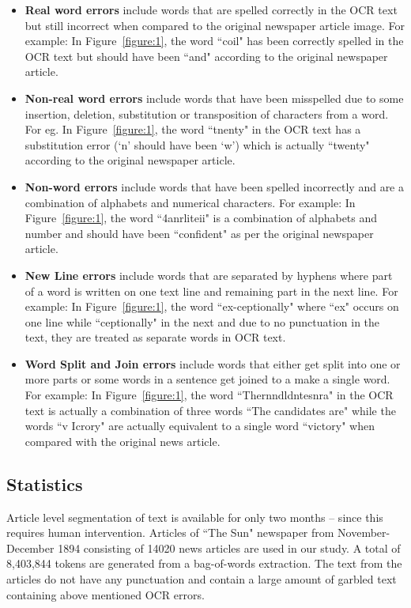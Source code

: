 \begin{itemize}
 \item \textbf{Real word errors}	 include words that are spelled correctly in the OCR text but still incorrect when compared to the original newspaper article image. For example: In Figure~\ref{figure:1}, the word ``coil"  has been correctly spelled in the OCR text  but should have been ``and" according to the original newspaper article. 
 \item \textbf{Non-real word errors} include words that have been misspelled due to some insertion, deletion, substitution or transposition of characters from a word. For eg. In Figure~\ref{figure:1}, the word ``tnenty" in the OCR text has a substitution error (`n' should have been `w') which is actually ``twenty" according to the original newspaper article.
 \item \textbf{Non-word errors} include words that have been spelled incorrectly and are a combination of alphabets and numerical characters. For example: In Figure~\ref{figure:1}, the word ``4anrliteii" is a combination of alphabets and number and should have been ``confident" as per the original newspaper article.
\item \textbf{New Line errors} include words that are separated by hyphens where part of a word is written on one text line and remaining part in the next line. For example: In Figure~\ref{figure:1}, the word ``ex-ceptionally" where ``ex" occurs on one line while ``ceptionally" in the next and due to no punctuation in the text, they are treated as separate words in OCR text.
\item \textbf{Word Split and Join errors} include words that either get split into one or more parts or some words in a sentence get joined to a make a single word. For example: In Figure~\ref{figure:1}, the word ``Thernndldntesnra" in the OCR text is actually a combination of three words ``The candidates are" while the words ``v Icrory" are actually equivalent to a single word ``victory" when compared with the original news article.
\end{itemize} 

\subsection{Statistics}
Article level segmentation of text is available for only two months -- since this requires human intervention. Articles of ``The Sun" newspaper from November-December 1894 consisting of 14020 news articles are used in our study. A total of 8,403,844 tokens are generated from a bag-of-words extraction. 
The text from the articles do not have any punctuation and contain a large amount of garbled text containing above mentioned OCR errors.


